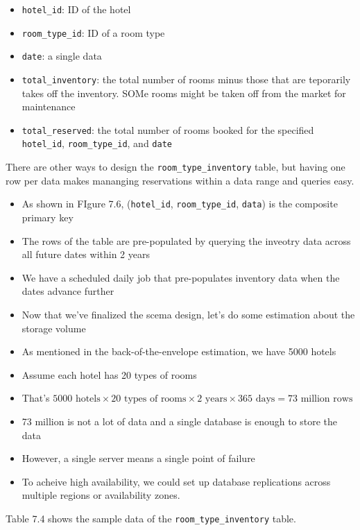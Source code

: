 \documentclass{report}
\theoremstyle{definition}
\begin{document}
\begin{itemize}
\item
\lstinline|hotel_id|: ID of the hotel
\item
\lstinline|room_type_id|: ID of a room type
\item
\lstinline|date|: a single data
\item
\lstinline|total_inventory|: the total number of rooms minus those that are teporarily takes off the inventory. SOMe rooms might be taken off from the market for maintenance
\item
\lstinline|total_reserved|: the total number of rooms booked for the specified \lstinline|hotel_id|, \lstinline|room_type_id|, and \lstinline|date|
\end{itemize}

There are other ways to design the \lstinline|room_type_inventory| table, but having one row per data makes mananging reservations within a data range and queries easy.

\begin{itemize}
\item
As shown in FIgure 7.6, (\lstinline|hotel_id|, \lstinline|room_type_id|, \lstinline|data|) is the composite primary key
\item
The rows of the table are pre-populated by querying the inveotry data across all future dates within 2 years
\item
We have a scheduled daily job that pre-populates inventory data when the dates advance further
\item
Now that we've finalized the scema design, let's do some estimation about the storage volume
\item
As mentioned in the back-of-the-envelope estimation, we have 5000 hotels
\item
Assume each hotel has 20 types of rooms
\item
That's $5000 \text{ hotels} \times 20 \text{ types of rooms} \times 2 \text{ years} \times 365  \text{ days} = 73 \text{ million rows}$
\item
73 million is not a lot of data and a single database is enough to store the data
\item
However, a single server means a single point of failure
\item
To acheive high availability, we could set up database replications across multiple regions or availability zones.
\end{itemize}

Table 7.4 shows the sample data of the \lstinline|room_type_inventory| table.
\end{document}
